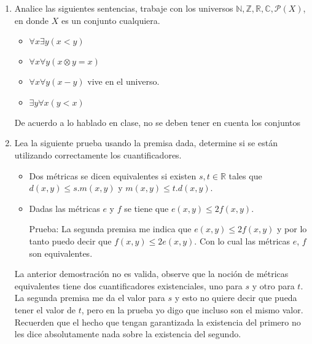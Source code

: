 \begin{enumerate}
\begin{solucion}
    Es importante anotar que para este universo los elementos son objetos como los naturales, reales, partes de un conjunto, etc. No son elementos del conjunto objetos como 2,$\pi$, etc.
    \end{solucion}

    \item Analice las siguientes sentencias, trabaje con los universos $\mathbb{N},\mathbb{Z},\mathbb{R},\mathbb{C},\mathcal{P}(X)$, en donde $X$ es un conjunto cualquiera.

    \begin{multicols}{2}
    \begin{itemize}
        \item  $ \forall x \exists y ( x < y ) $
        \item $\forall x \forall y ( x \otimes y = x ) $
    \end{itemize}
    \columnbreak
    \begin{itemize}
        \item $ \forall x \forall y ( x - y) $ vive en el universo.
        \item $ \exists y \forall x ( y < x ) $
    \end{itemize}
    \end{multicols}

    \begin{solucion}
    De acuerdo a lo hablado en clase, no se deben tener en cuenta los conjuntos
    \end{solucion}

    \item Lea la siguiente prueba usando la premisa dada, determine si se están utilizando correctamente los cuantificadores.

    \begin{itemize}
        \item Dos métricas se dicen equivalentes si existen $s,t \in \mathbb{R}$ tales que $d(x,y) \leq s.m(x,y)$ y $m(x,y) \leq t.d(x,y)$.

        \item Dadas las métricas $e$ y $f$ se tiene que $e(x,y) \leq 2f(x,y)$.

        Prueba: La segunda premisa me indica que $e(x,y) \leq 2f(x,y)$ y por lo tanto puedo decir que $f(x,y) \leq 2e(x,y)$. Con lo cual las métricas $e$, $f$ son equivalentes.

    \end{itemize}

    \begin{solucion}
        La anterior demostración no es valida, observe que la noción de métricas equivalentes tiene dos cuantificadores existenciales, uno para $s$ y otro para $t$. La segunda premisa me da el valor para $s$ y esto no quiere decir que pueda tener el valor de $t$, pero en la prueba yo digo que incluso son el mismo valor. Recuerden que el hecho que tengan garantizada la existencia del primero no les dice absolutamente nada sobre la existencia del segundo.
    \end{solucion}


\end{enumerate}
